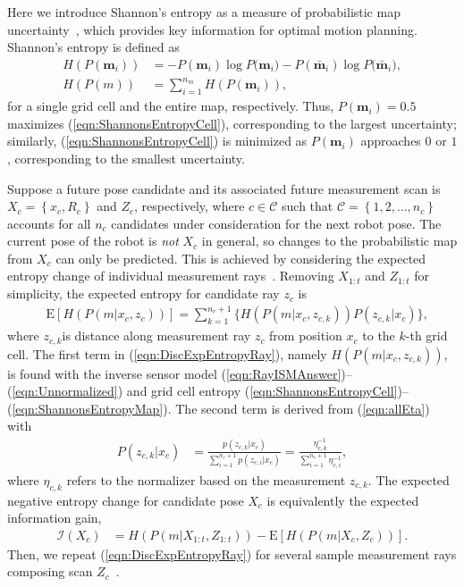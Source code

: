 \documentclass[smallextended]{svjour3}       %
\newcommand{\braces}[1]{\ensuremath{\left\{ #1 \right\}}}
\newcommand{\refeqn}[1]{(\ref{eqn:#1})}
\newcommand{\argmax}{\operatornamewithlimits{argmax}}
\begin{document}
Here we introduce Shannon's entropy as a measure of probabilistic map uncertainty~\cite{StaGriBur05}, which provides key information for optimal motion planning. Shannon's entropy is defined as
\begin{align}
\label{eqn:ShannonsEntropyCell}
H(P(\mathbf{m}_i))&=-P(\mathbf{m}_i)\log{P(\mathbf{m}_i})-P(\bar{\mathbf{m}}_i)\log{P(\bar{\mathbf{m}}_i}),
\\
\label{eqn:ShannonsEntropyMap}
H(P(m))&=\sum_{i=1}^{n_m}H(P(\mathbf{m}_i)),
\end{align}
for a single grid cell and the entire map, respectively.
Thus, $P(\mathbf{m}_i)=0.5$ maximizes \refeqn{ShannonsEntropyCell}, corresponding to the largest uncertainty; similarly, \refeqn{ShannonsEntropyCell} is minimized as $P(\mathbf{m}_i)$ approaches $0$ or $1$, corresponding to the smallest uncertainty. 

Suppose a future pose candidate and its associated future measurement scan is $X_c=\braces{x_c,R_c}$ and $Z_c$, respectively, where $c\in\mathcal C$ such that $\mathcal C=\braces{1,2,...,n_c}$ accounts for all $n_c$ candidates under consideration for the next robot pose. The current pose of the robot is \emph{not} $X_c$ in general, so changes to the probabilistic map from $X_c$ can only be predicted. 
This is achieved by considering the expected entropy change of individual measurement rays~\cite{KauAiLee16,KauTakAiLee17}. Removing $X_{1:t}$ and $Z_{1:t}$ for simplicity, the expected entropy for candidate ray $z_c$ is
\begin{align}
\label{eqn:DiscExpEntropyRay}
&\text{E}[H(P(m|x_c,z_{c}))]=\sum_{k=1}^{n_{r}+1}\bigg\{H(P(m|x_c,z_{c,k}))P(z_{c,k}|x_c)\bigg\},
\end{align}
where $z_{c,k}$is distance along measurement ray $z_{c}$ from position $x_c$ to the $k$-th grid cell. The first term in \refeqn{DiscExpEntropyRay}, namely $H(P(m|x_c,z_{c,k}))$, is found with the inverse sensor model \refeqn{RayISMAnswer}--\refeqn{Unnormalized} and grid cell entropy \refeqn{ShannonsEntropyCell}--\refeqn{ShannonsEntropyMap}.
The second term is derived from \refeqn{allEta} with
\begin{align}
\label{eqn:ProbMeas}
P(z_{c,k}|x_c)&=\frac{p(z_{c,k}|x_c)}{\sum_{i=1}^{n_{r}+1}p(z_{c,i}|x_c)}=\frac{\eta_{c,k}^{-1}}{\sum_{i=1}^{n_{r}+1}\eta_{c,i}^{-1}},
\end{align}
where $\eta_{c,k}$ refers to the normalizer based on the measurement $z_{c,k}$.
The expected negative entropy change for candidate pose $X_c$ is equivalently the expected information gain,
\begin{align}
\label{eqn:expectedInfoGainRay}
\mathcal I(X_c)&=H(P(m|X_{1:t},Z_{1:t}))-\text{E}\left[H(P(m|X_c,Z_c))\right].
\end{align}
Then, we repeat \refeqn{DiscExpEntropyRay} for several sample measurement rays composing scan $Z_c$~\cite{KauAiLee16}.
\end{document}
